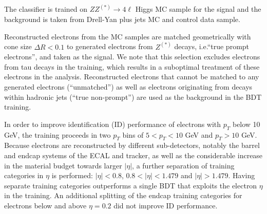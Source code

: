 The classifier is trained on $ZZ^{(*)}\to4\ell$ Higgs MC sample for the signal and the background is taken from Drell-Yan plus jets MC  and control data sample.
\par

Reconstructed electrons from the MC samples are matched geometrically with cone size $\Delta R < 0.1$ to generated electrons from $Z^{(*)}$ decays, 
i.e.``true prompt electrons'', and taken as the signal. We note that this selection excludes electrons from tau decays in the training, which results
in a suboptimal treatment of these electrons in the analysis. Reconstructed electrons that cannot be matched to any generated electrons (``unmatched'') 
as well as electrons originating from decays within hadronic jets (``true non-prompt'') are used as the background in the BDT training.
\par
In order to improve identification (ID) performance of electrons with $p_T$ below 10 GeV, the training proceeds in two $p_T$ bins 
of $5 < p_T < 10$ GeV and $p_T > 10$ GeV. Because electrons are reconstructed by different sub-detectors, notably the barrel and endcap 
systems of the ECAL and tracker, as well as the considerable increase in the material budget towards larger $|\eta|$,
a further separation of training categories in $\eta$ is performed: $|\eta| < 0.8$, $0.8 < |\eta| < 1.479$ and $|\eta| > 1.479$. Having 
separate training categories outperforms a single BDT that exploits the electron $\eta$ in the training. An additional splitting of the
endcap training categories for electrons below and above $\eta=0.2$ did not improve ID performance.

